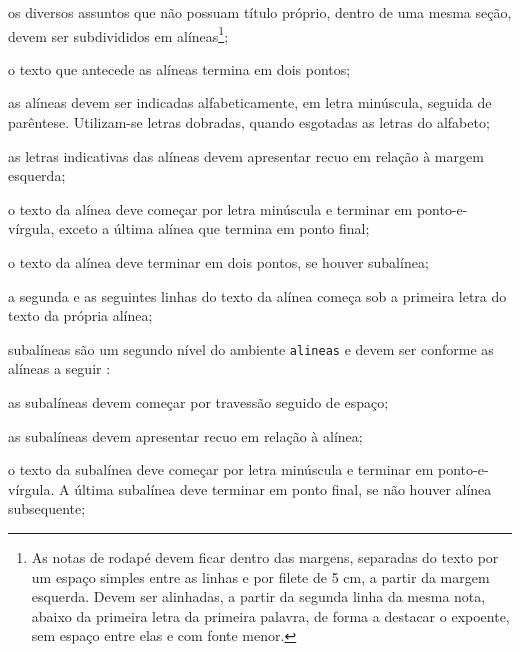 \begin{alineas}
  \item os diversos assuntos que não possuam título próprio, dentro de uma mesma
  seção, devem ser subdivididos em alíneas\footnote{As notas de rodapé devem ficar
  dentro das margens, separadas do texto por um espaço simples entre as
  linhas e por filete de 5 cm, a partir da margem esquerda. Devem ser
  alinhadas, a partir da segunda linha da mesma nota, abaixo da primeira letra
  da primeira palavra, de forma a destacar o expoente, sem espaço entre elas e
  com fonte menor. }; 
  
  \item o texto que antecede as alíneas termina em dois pontos;
  \item as alíneas devem ser indicadas alfabeticamente, em letra minúscula,
  seguida de parêntese. Utilizam-se letras dobradas, quando esgotadas as
  letras do alfabeto;

  \item as letras indicativas das alíneas devem apresentar recuo em relação à
  margem esquerda;

  \item o texto da alínea deve começar por letra minúscula e terminar em
  ponto-e-vírgula, exceto a última alínea que termina em ponto final;

  \item o texto da alínea deve terminar em dois pontos, se houver subalínea;

  \item a segunda e as seguintes linhas do texto da alínea começa sob a
  primeira letra do texto da própria alínea;
  
  \item subalíneas  são um segundo nível 
  do ambiente \texttt{alineas} e  devem ser conforme as alíneas a
  seguir \cite[item~4.3]{NBR6024:2012}:

  \begin{alineas}
     \item as subalíneas devem começar por travessão seguido de espaço;

     \item as subalíneas devem apresentar recuo em relação à alínea;

     \item o texto da subalínea deve começar por letra minúscula e terminar em
     ponto-e-vírgula. A última subalínea deve terminar em ponto final, se não
     houver alínea subsequente;


\end{alineas}
\end{alineas}
